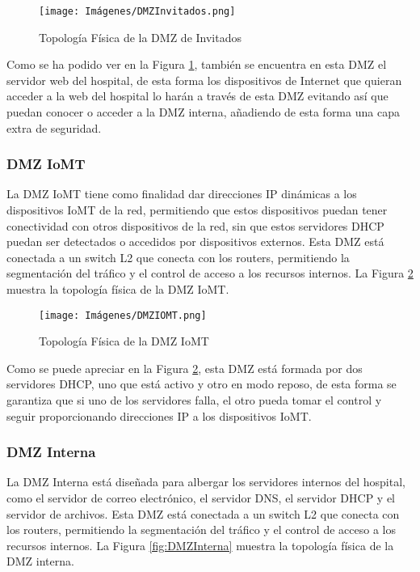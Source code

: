 \begin{figure}[H]
    \centering
    \texttt{[image: Imágenes/DMZInvitados.png]}
    \caption{Topología Física de la DMZ de Invitados}
    \label{fig:DMZInvitados}
\end{figure}

Como se ha podido ver en la Figura \ref{fig:DMZInvitados}, también se encuentra en esta DMZ el servidor web del hospital, de esta forma los dispositivos de Internet que quieran acceder
a la web del hospital lo harán a través de esta DMZ evitando así que puedan conocer o acceder a la DMZ interna, añadiendo de esta forma una capa extra de seguridad.

\subsubsection{DMZ IoMT}
La DMZ IoMT tiene como finalidad dar direcciones IP dinámicas a los dispositivos IoMT de la red, permitiendo que estos dispositivos puedan tener conectividad con otros dispositivos de la red, sin 
que estos servidores DHCP puedan ser detectados o accedidos por dispositivos externos. Esta DMZ está conectada a un switch L2 que conecta con los routers, permitiendo la segmentación del tráfico 
y el control de acceso a los recursos internos. La Figura \ref{fig:DMZIOMT} muestra la topología física de la DMZ IoMT.

\begin{figure}[H]
    \centering
    \texttt{[image: Imágenes/DMZIOMT.png]}
    \caption{Topología Física de la DMZ IoMT}
    \label{fig:DMZIOMT}
\end{figure}

Como se puede apreciar en la Figura \ref{fig:DMZIOMT}, esta DMZ está formada por dos servidores DHCP, uno que está activo y otro en modo reposo, de esta forma se garantiza que si uno de 
los servidores falla, el otro pueda tomar el control y seguir proporcionando direcciones IP a los dispositivos IoMT.

\subsubsection{DMZ Interna}
La DMZ Interna está diseñada para albergar los servidores internos del hospital, como el servidor de correo electrónico, el servidor DNS, el servidor DHCP y el servidor de archivos.
Esta DMZ está conectada a un switch L2 que conecta con los routers, permitiendo la segmentación del tráfico y el control de acceso a los recursos internos. La Figura \ref{fig:DMZInterna} 
muestra la topología física de la DMZ interna.

